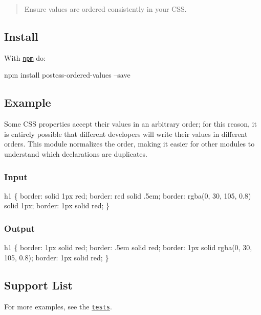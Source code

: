 \begin{quote}
Ensure values are ordered consistently in your C\+SS. \end{quote}


\subsection*{Install}

With \href{https://npmjs.org/package/postcss-ordered-values}{\tt npm} do\+:


\begin{DoxyCode}
npm install postcss-ordered-values --save
\end{DoxyCode}


\subsection*{Example}

Some C\+SS properties accept their values in an arbitrary order; for this reason, it is entirely possible that different developers will write their values in different orders. This module normalizes the order, making it easier for other modules to understand which declarations are duplicates.

\subsubsection*{Input}


\begin{DoxyCode}
h1 \{
    border: solid 1px red;
    border: red solid .5em;
    border: rgba(0, 30, 105, 0.8) solid 1px;
    border: 1px solid red;
\}
\end{DoxyCode}


\subsubsection*{Output}


\begin{DoxyCode}
h1 \{
    border: 1px solid red;
    border: .5em solid red;
    border: 1px solid rgba(0, 30, 105, 0.8);
    border: 1px solid red;
\}
\end{DoxyCode}


\subsection*{Support List}

For more examples, see the \href{src/__tests__/index.js}{\tt tests}.


